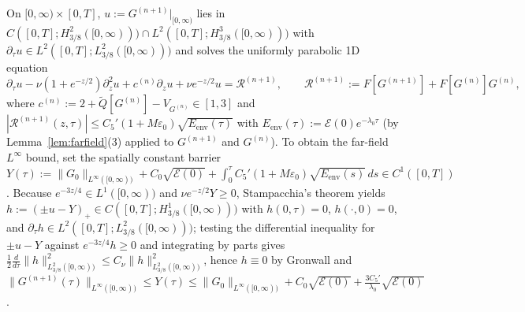 \documentclass[11pt,a4paper]{article}
\begin{document}
On $[0,\infty) \times [0,T]$, $u := G^{(n+1)}|_{[0,\infty)}$ lies in $C([0,T]; H^2_{3/8}([0,\infty))) \cap L^2([0,T]; H^3_{3/8}([0,\infty)))$ with $\partial_\tau u \in L^2([0,T]; L^2_{3/8}([0,\infty)))$ and solves the uniformly parabolic 1D equation
\[
\partial_\tau u - \nu(1+e^{-z/2})\partial_z^2 u + c^{(n)}\partial_z u + \nu e^{-z/2} u = \mathcal{R}^{(n+1)}, \qquad \mathcal{R}^{(n+1)} := F[G^{(n+1)}] + F[G^{(n)}]G^{(n)},
\]
where $c^{(n)} := 2 + \widetilde{Q}[G^{(n)}] - V_{G^{(n)}} \in [1, 3]$ and $|\mathcal{R}^{(n+1)}(z,\tau)| \le C_5'(1 + M\varepsilon_0)\sqrt{E_{\mathrm{env}}(\tau)}$ with $E_{\mathrm{env}}(\tau) := \mathcal{E}(0)e^{-\lambda_0\tau}$ (by Lemma~\ref{lem:farfield}(3) applied to $G^{(n+1)}$ and $G^{(n)}$). To obtain the far-field $L^\infty$ bound, set the spatially constant barrier $Y(\tau) := \|G_0\|_{L^\infty([0,\infty))} + C_0\sqrt{\mathcal{E}(0)} + \int_0^\tau C_5'(1+M\varepsilon_0)\sqrt{E_{\mathrm{env}}(s)}\,ds \in C^1([0,T])$. Because $e^{-3z/4} \in L^1([0,\infty))$ and $\nu e^{-z/2}Y \ge 0$, Stampacchia's theorem yields $h := (\pm u - Y)_+ \in C([0,T]; H^1_{3/8}([0,\infty)))$ with $h(0,\tau) = 0$, $h(\cdot,0) = 0$, and $\partial_\tau h \in L^2([0,T]; L^2_{3/8}([0,\infty)))$; testing the differential inequality for $\pm u - Y$ against $e^{-3z/4}h \ge 0$ and integrating by parts gives $\frac{1}{2}\frac{d}{d\tau}\|h\|_{L^2_{3/8}([0,\infty))}^2 \le C_\nu\|h\|_{L^2_{3/8}([0,\infty))}^2$, hence $h \equiv 0$ by Gronwall and $\|G^{(n+1)}(\tau)\|_{L^\infty([0,\infty))} \le Y(\tau) \le \|G_0\|_{L^\infty([0,\infty))} + C_0\sqrt{\mathcal{E}(0)} + \frac{3 C_5'}{\lambda_0}\sqrt{\mathcal{E}(0)}$.
\end{document}
